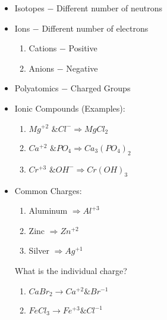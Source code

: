 \documentclass[12pt]{article}
\begin{document}
\begin{itemize}
\item Isotopes $-$ Different number of neutrons

\item Ions $-$ Different number of electrons

  \begin{enumerate}

    \item Cations $-$ Positive

    \item Anions $-$ Negative

  \end{enumerate}

\item Polyatomics $-$ Charged Groups

\item Ionic Compounds (Examples):

  \begin{enumerate}

    \item $Mg^{+2}\text{ \& }Cl^-\Rightarrow MgCl_2$

    \item $Ca^{+2}\text{ \& }PO_4\Rightarrow Ca_3(PO_4)_2$

    \item $Cr^{+3}\text{ \& }OH^-\Rightarrow Cr(OH)_3$

  \end{enumerate}

\item Common Charges:

  \begin{enumerate}

    \item Aluminum $\Rightarrow Al^{+3}$

    \item Zinc $\Rightarrow Zn^{+2}$

    \item Silver $\Rightarrow Ag^{+1}$

  \end{enumerate}

  \begin{center} What is the individual charge? \end{center}

\begin{enumerate}

  \item $CaBr_2 \rightarrow Ca^{+2} \& Br^{-1}$

  \item $FeCl_3 \rightarrow Fe^{+3} \& Cl^{-1}$


\end{enumerate}
\end{itemize}
\end{document}
